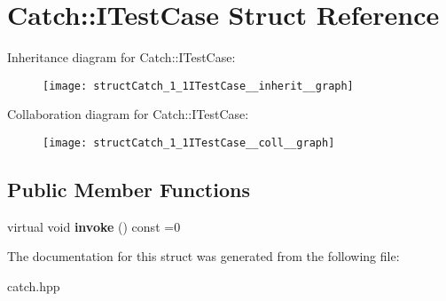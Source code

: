 \hypertarget{structCatch_1_1ITestCase}{}\section{Catch\+:\+:I\+Test\+Case Struct Reference}
\label{structCatch_1_1ITestCase}


Inheritance diagram for Catch\+:\+:I\+Test\+Case\+:
\nopagebreak
\begin{figure}[H]
\begin{center}
\leavevmode
\texttt{[image: structCatch\_1\_1ITestCase\_\_inherit\_\_graph]}
\end{center}
\end{figure}


Collaboration diagram for Catch\+:\+:I\+Test\+Case\+:
\nopagebreak
\begin{figure}[H]
\begin{center}
\leavevmode
\texttt{[image: structCatch\_1\_1ITestCase\_\_coll\_\_graph]}
\end{center}
\end{figure}
\subsection*{Public Member Functions}
\begin{DoxyCompactItemize}
\item 
\mbox{\label{structCatch_1_1ITestCase_a678825e62e7c17297621cfeb65588c34}} 
virtual void {\bfseries invoke} () const =0
\end{DoxyCompactItemize}


The documentation for this struct was generated from the following file\+:\begin{DoxyCompactItemize}
\item 
catch.\+hpp\end{DoxyCompactItemize}
